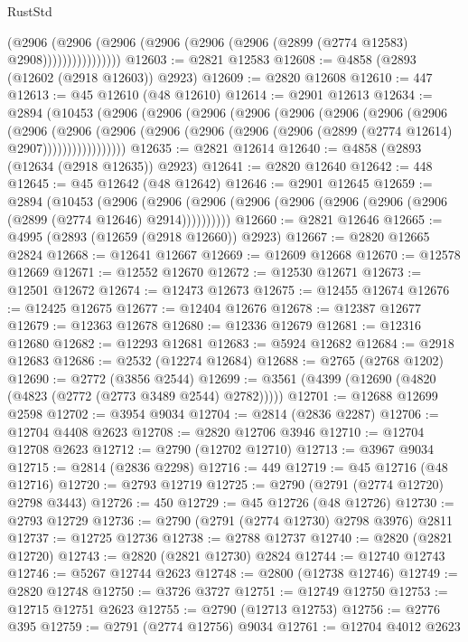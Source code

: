 \begin{lexlean}{RustStd}
\begin{coremodule}
                      (@2906
                        (@2906
                          (@2906 (@2906 (@2906 (@2906 (@2899 (@2774 @12583) @2908))))))))))))))))
@12603 := @2821 @12583
@12608 := @4858 (@2893 (@12602 (@2918 @12603)) @2923)
@12609 := @2820 @12608
@12610 := 447
@12613 := @45 @12610 (@48 @12610)
@12614 := @2901 @12613
@12634 := @2894
    (@10453
      (@2906
        (@2906
          (@2906
            (@2906
              (@2906
                (@2906
                  (@2906
                    (@2906
                      (@2906
                        (@2906
                          (@2906
                            (@2906 (@2906 (@2906 (@2906 (@2899 (@2774 @12614) @2907)))))))))))))))))
@12635 := @2821 @12614
@12640 := @4858 (@2893 (@12634 (@2918 @12635)) @2923)
@12641 := @2820 @12640
@12642 := 448
@12645 := @45 @12642 (@48 @12642)
@12646 := @2901 @12645
@12659 := @2894
    (@10453
      (@2906 (@2906 (@2906 (@2906 (@2906 (@2906 (@2906 (@2906 (@2899 (@2774 @12646) @2914))))))))))
@12660 := @2821 @12646
@12665 := @4995 (@2893 (@12659 (@2918 @12660)) @2923)
@12667 := @2820 @12665 @2824
@12668 := @12641 @12667
@12669 := @12609 @12668
@12670 := @12578 @12669
@12671 := @12552 @12670
@12672 := @12530 @12671
@12673 := @12501 @12672
@12674 := @12473 @12673
@12675 := @12455 @12674
@12676 := @12425 @12675
@12677 := @12404 @12676
@12678 := @12387 @12677
@12679 := @12363 @12678
@12680 := @12336 @12679
@12681 := @12316 @12680
@12682 := @12293 @12681
@12683 := @5924 @12682
@12684 := @2918 @12683
@12686 := @2532 (@12274 @12684)
@12688 := @2765 (@2768 @1202)
@12690 := @2772 (@3856 @2544)
@12699 := @3561 (@4399 (@12690 (@4820 (@4823 (@2772 (@2773 @3489 @2544) @2782)))))
@12701 := @12688 @12699 @2598
@12702 := @3954 @9034
@12704 := @2814 (@2836 @2287)
@12706 := @12704 @4408 @2623
@12708 := @2820 @12706 @3946
@12710 := @12704 @12708 @2623
@12712 := @2790 (@12702 @12710)
@12713 := @3967 @9034
@12715 := @2814 (@2836 @2298)
@12716 := 449
@12719 := @45 @12716 (@48 @12716)
@12720 := @2793 @12719
@12725 := @2790 (@2791 (@2774 @12720) @2798 @3443)
@12726 := 450
@12729 := @45 @12726 (@48 @12726)
@12730 := @2793 @12729
@12736 := @2790 (@2791 (@2774 @12730) @2798 @3976) @2811
@12737 := @12725 @12736
@12738 := @2788 @12737
@12740 := @2820 (@2821 @12720)
@12743 := @2820 (@2821 @12730) @2824
@12744 := @12740 @12743
@12746 := @5267 @12744 @2623
@12748 := @2800 (@12738 @12746)
@12749 := @2820 @12748
@12750 := @3726 @3727
@12751 := @12749 @12750
@12753 := @12715 @12751 @2623
@12755 := @2790 (@12713 @12753)
@12756 := @2776 @395
@12759 := @2791 (@2774 @12756) @9034
@12761 := @12704 @4012 @2623

\end{coremodule}
\end{lexlean}
